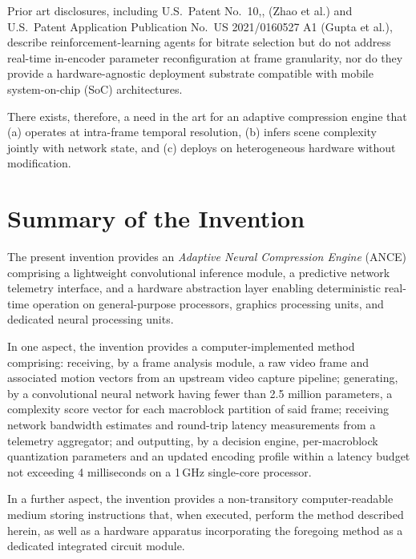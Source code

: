 \documentclass[12pt,letterpaper]{article}
\newcommand{\defterm}[1]{\textit{#1}}
\begin{document}
Prior art disclosures, including U.S.\ Patent No.\ 10,, (Zhao et al.) and
U.S.\ Patent Application Publication No.\ US 2021/0160527 A1 (Gupta et al.), describe
reinforcement-learning agents for bitrate selection but do not address real-time
in-encoder parameter reconfiguration at frame granularity, nor do they provide a
hardware-agnostic deployment substrate compatible with mobile system-on-chip (SoC)
architectures.

There exists, therefore, a need in the art for an adaptive compression engine that (a)
operates at intra-frame temporal resolution, (b) infers scene complexity jointly with
network state, and (c) deploys on heterogeneous hardware without modification.

\section{Summary of the Invention}\label{sec:summary}

The present invention provides an \defterm{Adaptive Neural Compression Engine} (ANCE)
comprising a lightweight convolutional inference module, a predictive network telemetry
interface, and a hardware abstraction layer enabling deterministic real-time operation
on general-purpose processors, graphics processing units, and dedicated neural
processing units.

In one aspect, the invention provides a computer-implemented method comprising:
receiving, by a frame analysis module, a raw video frame and associated motion vectors
from an upstream video capture pipeline; generating, by a convolutional neural network
having fewer than 2.5 million parameters, a complexity score vector for each
macroblock partition of said frame; receiving network bandwidth estimates and round-trip
latency measurements from a telemetry aggregator; and outputting, by a decision engine,
per-macroblock quantization parameters and an updated encoding profile within a latency
budget not exceeding 4 milliseconds on a 1\,GHz single-core processor.

In a further aspect, the invention provides a non-transitory computer-readable medium
storing instructions that, when executed, perform the method described herein, as well
as a hardware apparatus incorporating the foregoing method as a dedicated integrated
circuit module.

\end{document}
